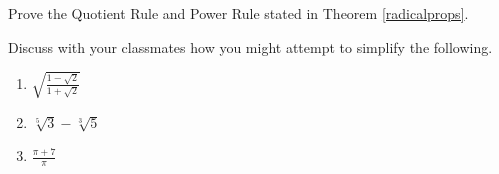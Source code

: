 \documentclass{ximera}
\begin{document}
\begin{problem}
Prove the Quotient Rule and Power Rule stated in Theorem \ref{radicalprops}.
\end{problem}

\begin{problem}
Discuss with your classmates how you might attempt to simplify the following.

\begin{enumerate}

\item $\sqrt{\frac{1 - \sqrt{2}}{1 + \sqrt{2}}}$

\item $\sqrt[5]{3} - \sqrt[3]{5}$

\item $\frac{\pi + 7}{\pi}$

\end{enumerate}

\end{problem}
\end{document}
